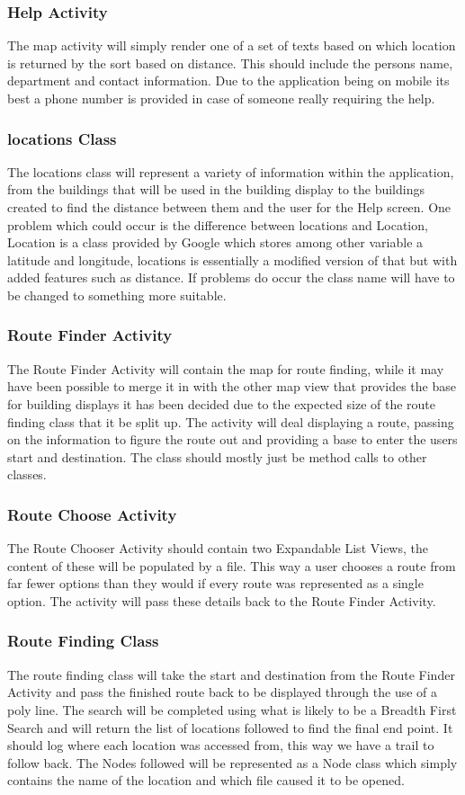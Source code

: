 \documentclass[10pt,a4paper]{article}
\begin{document}
\subsubsection{Help Activity}
The map activity will simply render one of a set of texts based on which location is returned by the sort based on distance. This should include the persons name, department and contact information. Due to the application being on mobile its best a phone number is provided in case of someone really requiring the help. 
\subsubsection{locations Class}
The locations class will represent a variety of information within the application, from the buildings that will be used in the building display to the buildings created to find the distance between them and the user for the Help screen. One problem which could occur is the difference between locations and Location, Location is a class provided by Google which stores among other variable a latitude and longitude, locations is essentially a modified version of that but with added features such as distance. If problems do occur the class name will have to be changed to something more suitable. 
\subsubsection{Route Finder Activity}
The Route Finder Activity will contain the map for route finding, while it may have been possible to merge it in with the other map view that provides the base for building displays it has been decided due to the expected size of the route finding class that it be split up. The activity will deal displaying a route, passing on the information to figure the route out and providing a base to enter the users start and destination. The class should mostly just be method calls to other classes.
\subsubsection{Route Choose Activity}
The Route Chooser Activity should contain two Expandable List Views, the content of these will be populated by a file. This way a user chooses a route from far fewer options than they would if every route was represented as a single option. The activity will pass these details back to the Route Finder Activity.
\subsubsection{Route Finding Class}
The route finding class will take the start and destination from the Route Finder Activity and pass the finished route back to be displayed through the use of a poly line. The search will be completed using what is likely to be a Breadth First Search and will return the list of locations followed to find the final end point. It should log where each location was accessed from, this way we have a trail to follow back. The Nodes followed will be represented as a Node class which simply contains the name of the location and which file caused it to be opened.
\end{document}
